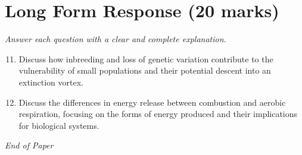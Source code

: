 \documentclass[12pt]{article}
\begin{document}
\section*{Long Form Response (20 marks)}
\textit{Answer each question with a clear and complete explanation.}
\begin{enumerate}[label=\arabic*.]
\setcounter{enumi}{10}
\item Discuss how inbreeding and loss of genetic variation contribute to the vulnerability of small populations and their potential descent into an extinction vortex.
\item Discuss the differences in energy release between combustion and aerobic respiration, focusing on the forms of energy produced and their implications for biological systems.
\end{enumerate}

\vfill
\noindent\textit{End of Paper}
\end{document}
